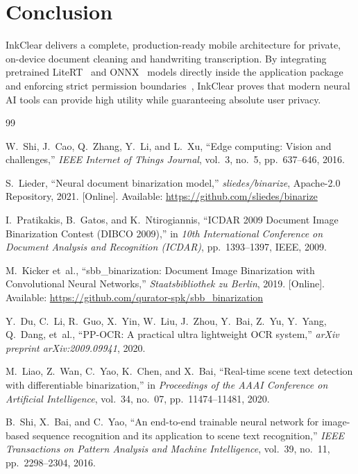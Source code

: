 \documentclass[11pt,a4paper]{article}
\begin{document}
\section{Conclusion}

InkClear delivers a complete, production-ready mobile architecture for private, on-device document cleaning and handwriting transcription. By integrating pretrained LiteRT~\cite{david2021tflite} and ONNX~\cite{onnxruntime2021} models directly inside the application package and enforcing strict permission boundaries~\cite{shi2016edge}, InkClear proves that modern neural AI tools can provide high utility while guaranteeing absolute user privacy.

\begin{thebibliography}{99}

W.~Shi, J.~Cao, Q.~Zhang, Y.~Li, and L.~Xu,
``Edge computing: Vision and challenges,''
\emph{IEEE Internet of Things Journal}, vol.~3, no.~5, pp.~637--646, 2016.

S.~Lieder,
``Neural document binarization model,''
\emph{sliedes/binarize}, Apache-2.0 Repository, 2021. [Online]. Available: \url{https://github.com/sliedes/binarize}

I.~Pratikakis, B.~Gatos, and K.~Ntirogiannis,
``ICDAR 2009 Document Image Binarization Contest (DIBCO 2009),''
in \emph{10th International Conference on Document Analysis and Recognition (ICDAR)}, pp.~1393--1397, IEEE, 2009.

M.~Kicker et~al.,
``sbb\_binarization: Document Image Binarization with Convolutional Neural Networks,''
\emph{Staatsbibliothek zu Berlin}, 2019. [Online]. Available: \url{https://github.com/qurator-spk/sbb_binarization}

Y.~Du, C.~Li, R.~Guo, X.~Yin, W.~Liu, J.~Zhou, Y.~Bai, Z.~Yu, Y.~Yang, Q.~Dang, et~al.,
``PP-OCR: A practical ultra lightweight OCR system,''
\emph{arXiv preprint arXiv:2009.09941}, 2020.

M.~Liao, Z.~Wan, C.~Yao, K.~Chen, and X.~Bai,
``Real-time scene text detection with differentiable binarization,''
in \emph{Proceedings of the AAAI Conference on Artificial Intelligence}, vol.~34, no.~07, pp.~11474--11481, 2020.

B.~Shi, X.~Bai, and C.~Yao,
``An end-to-end trainable neural network for image-based sequence recognition and its application to scene text recognition,''
\emph{IEEE Transactions on Pattern Analysis and Machine Intelligence}, vol.~39, no.~11, pp.~2298--2304, 2016.


\end{thebibliography}
\end{document}

